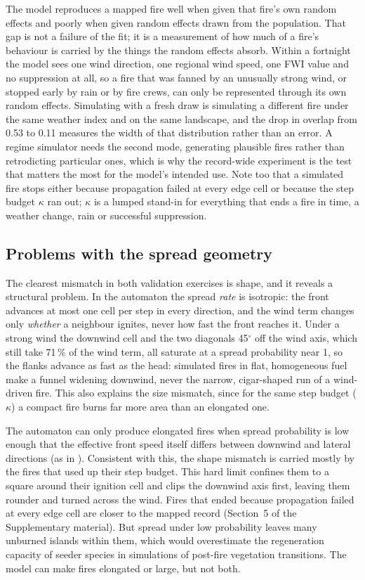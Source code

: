 \documentclass[ResearchPaper,linenum]{CSIRO_LaTeX_Template}
\begin{document}
The model reproduces a mapped fire well when given that fire's own random effects and
poorly when given random effects drawn from the population. That gap is not a failure
of the fit; it is a measurement of how much of a fire's behaviour is carried by the
things the random effects absorb. Within a fortnight the model sees one wind direction,
one regional wind speed, one FWI value and no suppression at all, so a fire that was
fanned by an unusually strong wind, or stopped early by rain or by fire crews, can only
be represented through its own random effects. Simulating with a fresh draw is
simulating a different fire under the same weather index and on the same landscape, and
the drop in overlap from 0.53 to 0.11 measures the width of that distribution rather
than an error. A regime simulator needs the second mode, generating plausible fires
rather than retrodicting particular ones, which is why the record-wide experiment is
the test that matters the most for the model's intended use. Note too that a simulated fire
stops either because propagation failed at every edge cell or because the step budget
$\kappa$ ran out; $\kappa$ is a lumped stand-in for everything that ends a fire in
time, a weather change, rain or successful suppression.

\subsection*{Problems with the spread geometry}

The clearest mismatch in both validation exercises is shape, and it reveals a structural problem. 
In the automaton the spread \emph{rate} is isotropic: the front advances at most one cell per step
in every direction, and the wind term changes only \emph{whether} a neighbour ignites, never
how fast the front reaches it. Under a strong wind the downwind cell and the two diagonals
45$^\circ$ off the wind axis, which still take 71\,\% of the wind term, all saturate at a
spread probability near 1, so the flanks advance as fast as the head: simulated fires in
flat, homogeneous fuel make a funnel widening downwind, never the narrow, cigar-shaped run
of a wind-driven fire. This also explains the size mismatch, since for the same step budget
($\kappa$) a compact fire burns far more area than an elongated one.

The automaton can only produce elongated fires when spread probability is low enough 
that the effective front speed itself differs between
downwind and lateral directions (as in \citealt{morales_stochastic_2015}). Consistent with
this, the shape mismatch is carried mostly by the fires that used up their step budget.
This hard limit confines them to a square around 
their ignition cell and clips the downwind axis first,
leaving them rounder and turned across the wind. Fires that ended because propagation failed
at every edge cell are closer to the mapped record (Section~5 of the Supplementary material).
But spread under low probability leaves many unburned islands within
them, which would overestimate the regeneration capacity of seeder species in simulations of
post-fire vegetation transitions. The model can make fires elongated or large, but not both.
\end{document}
